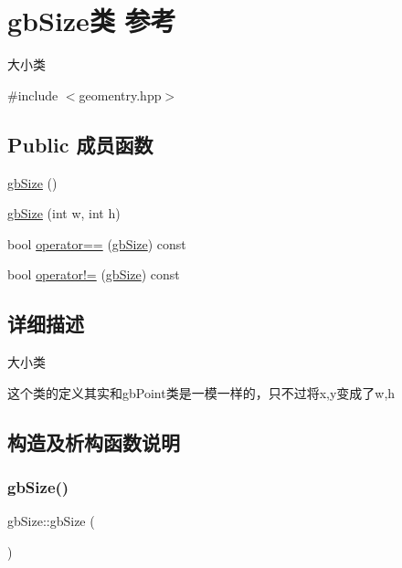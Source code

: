 \hypertarget{classgb_size}{}\section{gb\+Size类 参考}
\label{classgb_size}


大小类  




{\ttfamily \#include $<$geomentry.\+hpp$>$}

\subsection*{Public 成员函数}
\begin{DoxyCompactItemize}
\item 
\mbox{\hyperlink{classgb_size_af390f2ea32d64ffa3b74f1c0da1d9380}{gb\+Size}} ()
\item 
\mbox{\hyperlink{classgb_size_add567a0e5d087f3e02aa946f85324eab}{gb\+Size}} (int w, int h)
\item 
bool \mbox{\hyperlink{classgb_size_abd08171a7d3cbc6b31a101a40d480a9b}{operator==}} (\mbox{\hyperlink{classgb_size}{gb\+Size}}) const
\item 
bool \mbox{\hyperlink{classgb_size_a2244c845aebe7337f422a5684a3f06f6}{operator!=}} (\mbox{\hyperlink{classgb_size}{gb\+Size}}) const
\end{DoxyCompactItemize}


\subsection{详细描述}
大小类 

这个类的定义其实和gb\+Point类是一模一样的，只不过将x,y变成了w,h 

\subsection{构造及析构函数说明}
\mbox{\label{classgb_size_af390f2ea32d64ffa3b74f1c0da1d9380}} 
\subsubsection{\texorpdfstring{gbSize()}{gbSize()}\hspace{0.1cm}{\footnotesize\ttfamily [1/2]}}
{\footnotesize\ttfamily gb\+Size\+::gb\+Size (\begin{DoxyParamCaption}{ }\end{DoxyParamCaption})}

